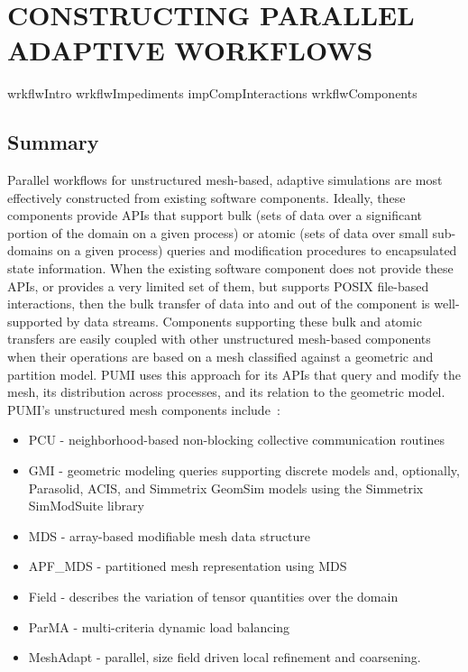 \chapter{CONSTRUCTING PARALLEL ADAPTIVE WORKFLOWS}
\label{chp:workflow}
{wrkflwIntro}
{wrkflwImpediments}
{impCompInteractions}
{wrkflwComponents}

\section{Summary}
Parallel workflows for unstructured mesh-based, adaptive simulations are most
effectively constructed from existing software components.
Ideally, these components provide APIs that support bulk (sets of data
over a significant portion of the domain on a given process) or atomic (sets of
data over small sub-domains on a given process) queries and modification
procedures to encapsulated state information.
When the existing software component does not provide these APIs, or provides a
very limited set of them, but supports POSIX file-based interactions, then the
bulk transfer of data into and out of the component is well-supported by
data streams.
Components supporting these bulk and atomic transfers are easily coupled with
other unstructured mesh-based components when their operations are based on a
mesh classified against a geometric and partition model.
PUMI uses this approach for its APIs that query and modify the mesh, its
distribution across processes, and its relation to the geometric model.
PUMI's unstructured mesh components include~\cite{ibanez2016pumi}:
\begin{itemize}
\item PCU - neighborhood-based non-blocking collective communication routines
\item GMI - geometric modeling queries supporting discrete models
  and, optionally, Parasolid, ACIS, and Simmetrix GeomSim models using
  the Simmetrix SimModSuite library
\item MDS - array-based modifiable mesh data structure
\item APF\_MDS - partitioned mesh representation using MDS
\item Field - describes the variation of tensor quantities over the domain
\item ParMA - multi-criteria dynamic load balancing
\item MeshAdapt - parallel, size field driven local refinement and coarsening.
\end{itemize}
